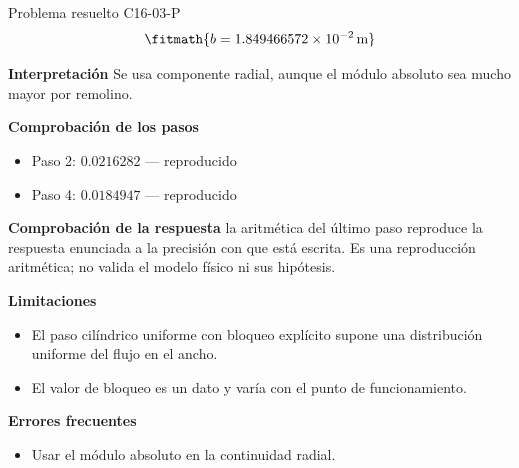 \documentclass[10pt,openany]{book}
\begin{document}
\begin{studiumworked}{Problema resuelto C16-03-P}
\[
\fitmath{b=1.849466572\times10^{-2}\,\mathrm{m}}
\]

\noindent\textbf{Interpretación}
Se usa componente radial, aunque el módulo absoluto sea mucho mayor por remolino.

\noindent\textbf{Comprobación de los pasos}
\begin{itemize}
\item Paso 2: $0.0216282$ — reproducido
\item Paso 4: $0.0184947$ — reproducido
\end{itemize}

\noindent\textbf{Comprobación de la respuesta} la aritmética del último paso reproduce la respuesta enunciada a la precisión con que está escrita. Es una reproducción aritmética; no valida el modelo físico ni sus hipótesis.

\noindent\textbf{Limitaciones}
\begin{itemize}
\item El paso cilíndrico uniforme con bloqueo explícito supone una distribución uniforme del flujo en el ancho.
\item El valor de bloqueo es un dato y varía con el punto de funcionamiento.
\end{itemize}

\noindent\textbf{Errores frecuentes}
\begin{itemize}
\item Usar el módulo absoluto en la continuidad radial.
\end{itemize}
\end{studiumworked}
\end{document}
